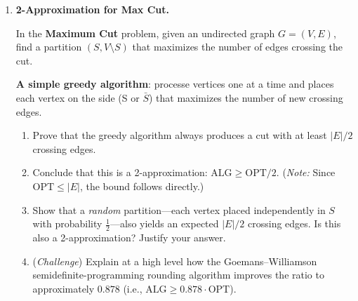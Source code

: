 \documentclass[9pt]{book}
\begin{document}
\begin{enumerate}[label=\arabic*.]
\begin{enumerate}[label=(\alph*)]
  \item Describe the MST-based 2-approximation algorithm for Metric TSP.
  \item Prove the algorithm produces a valid tour.
  \item Prove the approximation ratio: $\mathrm{cost}(\mathrm{ALG})\le 2\cdot\mathrm{OPT}$.
        (\textit{Hint:} Lower-bound OPT by the MST cost, then argue that the pre-order DFS
        walk can be shortcut using the triangle inequality.)
  \item Explain why the triangle inequality is crucial: show that for general TSP (no metric
        assumption), no polynomial-time $\rho$-approximation exists for any constant $\rho\ge 1$
        unless $P=NP$.  (\textit{Hint:} Give a gap-preserving reduction from Hamiltonian Cycle.)
  \item (\textit{Challenge}) Briefly describe the Christofides--Serdyukov algorithm and state
        why it achieves a $\frac{3}{2}$-approximation.  Explain why matching the odd-degree
        vertices in the MST reduces the factor from 2 to $\frac{3}{2}$.
\end{enumerate}

\bigskip

\item \textbf{2-Approximation for Max Cut.}


In the \textbf{Maximum Cut} problem, given an undirected graph $G=(V,E)$, find a partition
$(S, V\setminus S)$ that maximizes the number of edges crossing the cut.

{\bf A simple greedy algorithm}: processe vertices one at a time and places each
        vertex on the side (S or $\bar{S}$) that maximizes the number of new crossing edges.
  
\begin{enumerate}[label=(\alph*)]
  \item Prove that the greedy algorithm always produces a cut with at least $|E|/2$ crossing
        edges.
  \item Conclude that this is a 2-approximation: $\mathrm{ALG}\ge\mathrm{OPT}/2$.
        (\textit{Note:} Since $\mathrm{OPT}\le|E|$, the bound follows directly.)
  \item Show that a \emph{random} partition---each vertex placed independently in $S$ with
        probability $\tfrac{1}{2}$---also yields an expected $|E|/2$ crossing edges.
        Is this also a 2-approximation?  Justify your answer.
  \item (\textit{Challenge}) Explain at a high level how the Goemans--Williamson
        semidefinite-programming rounding algorithm improves the ratio to approximately
        $0.878$ (i.e., $\mathrm{ALG}\ge 0.878\cdot\mathrm{OPT}$).
\end{enumerate}


\end{enumerate}
\end{document}
